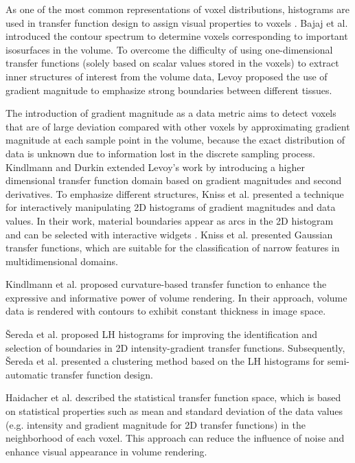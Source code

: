 \documentclass{egpubl}
\begin{document}
As one of the most common representations of voxel distributions, histograms are used in transfer function design to assign visual properties to voxels \cite{pfister_transfer_2001}. Bajaj et al. \cite{bajaj_contour_1997} introduced the contour spectrum to determine voxels corresponding to important isosurfaces in the volume. To overcome the difficulty of using one-dimensional transfer functions (solely based on scalar values stored in the voxels) to extract inner structures of interest from the volume data, Levoy \cite{levoy_display_1988} proposed the use of gradient magnitude to emphasize strong boundaries between different tissues.

The introduction of gradient magnitude as a data metric aims to detect voxels that are of large deviation compared with other voxels by approximating gradient magnitude at each sample point in the volume, because the exact distribution of data is unknown due to information lost in the discrete sampling process.
Kindlmann and Durkin \cite{kindlmann_semi-automatic_1998} extended Levoy's work \cite{levoy_display_1988} by introducing a higher dimensional transfer function domain based on gradient magnitudes and second derivatives. To emphasize different structures, Kniss et al. \cite{kniss_interactive_2001} presented a technique for interactively manipulating 2D histograms of gradient magnitudes and data values. In their work, material boundaries appear as arcs in the 2D histogram and can be selected with interactive widgets \cite{kniss_multidimensional_2002}.
Kniss et al. \cite{kniss_gaussian_2003} presented Gaussian transfer functions, which are suitable for the classification of narrow features in multidimensional domains.

Kindlmann et al. \cite{kindlmann_curvature-based_2003} proposed curvature-based transfer function to enhance the expressive and informative power of volume rendering. In their approach, volume data is rendered with contours to exhibit constant thickness in image space.

{\v S}ereda et al. \cite{sereda_visualization_2006} proposed LH histograms for improving the identification and selection of boundaries in 2D intensity-gradient transfer functions. Subsequently, {\v S}ereda et al. \cite{sereda_automating_2006} presented a clustering method based on the LH histograms for semi-automatic transfer function design.

Haidacher et al. \cite{haidacher_volume_2010} described the statistical transfer function space, which is based on statistical properties such as mean and standard deviation of the data values (e.g. intensity and gradient magnitude for 2D transfer functions) in the neighborhood of each voxel. This approach can reduce the influence of noise and enhance visual appearance in volume rendering.
\end{document}
